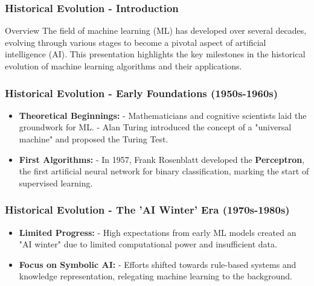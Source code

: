 \documentclass[aspectratio=169]{beamer}
\begin{document}
\begin{frame}[fragile]
    \frametitle{Historical Evolution - Introduction}
    \begin{block}{Overview}
        The field of machine learning (ML) has developed over several decades, evolving through various stages to become a pivotal aspect of artificial intelligence (AI). 
        This presentation highlights the key milestones in the historical evolution of machine learning algorithms and their applications.
    \end{block}
\end{frame}

\begin{frame}[fragile]
    \frametitle{Historical Evolution - Early Foundations (1950s-1960s)}
    \begin{itemize}
        \item \textbf{Theoretical Beginnings:} 
            - Mathematicians and cognitive scientists laid the groundwork for ML. 
            - Alan Turing introduced the concept of a "universal machine" and proposed the Turing Test.
        \item \textbf{First Algorithms:} 
            - In 1957, Frank Rosenblatt developed the \textbf{Perceptron}, the first artificial neural network for binary classification, marking the start of supervised learning.
    \end{itemize}
\end{frame}

\begin{frame}[fragile]
    \frametitle{Historical Evolution - The 'AI Winter' Era (1970s-1980s)}
    \begin{itemize}
        \item \textbf{Limited Progress:} 
            - High expectations from early ML models created an "AI winter" due to limited computational power and insufficient data.
        \item \textbf{Focus on Symbolic AI:} 
            - Efforts shifted towards rule-based systems and knowledge representation, relegating machine learning to the background.
    \end{itemize}
\end{frame}
\end{document}

